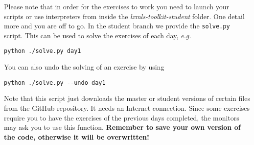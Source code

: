 Please note that in order for the exercises to work you need to launch your scripts or use interpreters from inside the  \textit{lxmls-toolkit-student} folder. One detail more and you are off to go. In the student branch we provide the \verb+solve.py+ script. This can be used to solve the exercises of each day, \emph{e.g.}

\begin{verbatim}
python ./solve.py day1
\end{verbatim}

\noindent You can also undo the solving of an exercise by using

\begin{verbatim}
python ./solve.py --undo day1
\end{verbatim}

Note that this script just downloads the master or student versions of certain files from the GitHub repository. It needs an Internet connection. Since some exercises require you to have the exercises of the previous days completed, the monitors may ask you to use this function. \textbf{Remember to save your own version of the code, otherwise it will be overwritten!}

